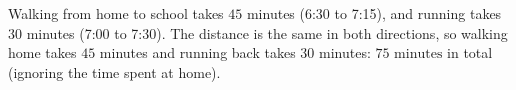 Walking from home to school takes $45$ minutes (6:30 to 7:15), and running takes $30$ minutes (7:00 to 7:30). The distance is the same in both directions, so walking home takes $45$ minutes and running back takes $30$ minutes: $\boxed{75\text{ minutes}}$ in total (ignoring the time spent at home).
